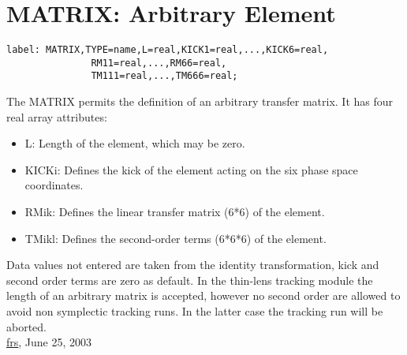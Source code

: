 



\section{MATRIX: Arbitrary Element}
\begin{verbatim}
label: MATRIX,TYPE=name,L=real,KICK1=real,...,KICK6=real,
               RM11=real,...,RM66=real,
               TM111=real,...,TM666=real;
\end{verbatim} The MATRIX permits the definition of an arbitrary transfer matrix. It has four real array attributes: 
\begin{itemize}
	\item L: Length of the element, which may be zero. 
	\item KICKi: Defines the kick of the element acting on the six phase space coordinates. 
	\item RMik: Defines the linear transfer matrix (6*6) of the element. 
	\item TMikl: Defines the second-order terms (6*6*6) of the element. 
\end{itemize} Data values not entered are taken from the identity transformation, kick and second order terms are zero as default. In the thin-lens tracking module the length of an arbitrary matrix is accepted, however no second order are allowed to avoid non symplectic tracking runs. In the latter case the tracking run will be aborted.
\\
   \href{http://www.cern.ch/Frank/Schmidt/frs_sign.html}{frs}, June 25, 2003 

